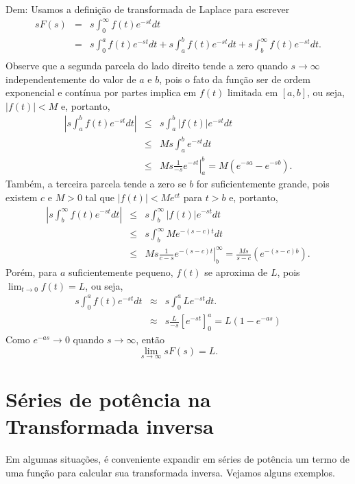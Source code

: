 \documentclass[a4paper,10pt]{book}
\begin{document}
Dem: Usamos a definição de transformada de Laplace para escrever
\begin{eqnarray*}
sF(s)&=&s\int_0^\infty f(t)e^{-st}dt\\
&=&s\int_0^a f(t)e^{-st}dt+s\int_a^b f(t)e^{-st}dt+s\int_b^\infty f(t)e^{-st}dt.\\
\end{eqnarray*}
Observe que a segunda parcela do lado direito tende a zero quando $s\to \infty$ independentemente do valor de $a$ e $b$, pois o fato da função ser de ordem exponencial e contínua por partes implica em $f(t)$ limitada em $[a,b]$, ou seja, $|f(t)|<M$ e, portanto,
\begin{eqnarray*}
\left|s\int_a^b f(t)e^{-st}dt\right|&\leq & s\int_a^b |f(t)|e^{-st}dt\\
&\leq & Ms\int_a^b e^{-st}dt\\
&\leq & \left.Ms\frac{1}{-s} e^{-st}\right|_a^b=M(e^{-sa}-e^{-sb}).
\end{eqnarray*}
Também, a terceira parcela tende a zero se $b$ for suficientemente grande, pois existem $c$ e $M>0$ tal que $|f(t)|<Me^{ct}$ para $t>b$ e, portanto,
\begin{eqnarray*}
\left|s\int_b^\infty f(t)e^{-st}dt\right|&\leq & s\int_b^\infty |f(t)|e^{-st}dt\\
&\leq & s\int_b^\infty Me^{-(s-c)t}dt\\
&\leq & \left.Ms\frac{1}{c-s} e^{-(s-c)t}\right|_b^\infty=\frac{Ms}{s-c}(e^{-(s-c)b}).
\end{eqnarray*}
Porém, para $a$ suficientemente pequeno, $f(t)$ se aproxima de $L$, pois $\displaystyle \lim_{t\to 0}f(t)=L$, ou seja,
\begin{eqnarray*}
s\int_0^a f(t)e^{-st}dt &\approx &s\int_0^a L e^{-st}dt.\\
&\approx &s\frac{L}{-s}\left[ e^{-st}\right]_0^a=L\left(1-e^{-as}\right)
\end{eqnarray*}
Como $e^{-as}\to 0$ quando $s\to \infty$, então
\begin{equation}
\lim_{s\to \infty} sF(s)=L.
\end{equation} 


\section{Séries de potência na Transformada inversa}
 Em algumas situações, é conveniente expandir em séries de potência um termo de uma função para calcular sua transformada inversa. Vejamos alguns exemplos.
\end{document}
